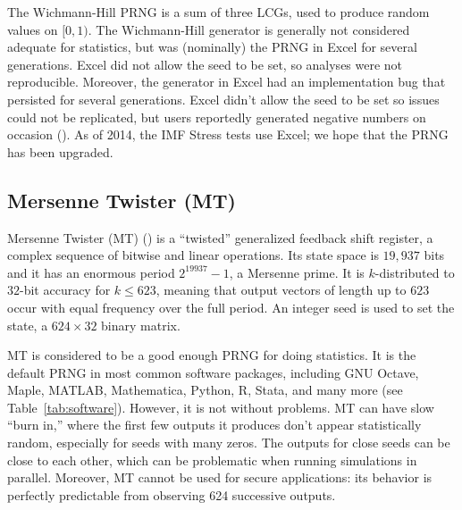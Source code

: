 \documentclass[graybox]{svmult}
\newcommand{\todo}[1]{{\color{red}{TO DO: \sc #1}}}
\begin{document}
The Wichmann-Hill PRNG is a sum of three LCGs, used to produce random values on $[0, 1)$.
%
The Wichmann-Hill generator is generally not considered adequate for statistics, but was (nominally) the PRNG in Excel for several generations. 
Excel did not allow the seed to be set, so analyses were not reproducible.
Moreover, the generator in Excel had an implementation bug that persisted for several generations.
Excel didn't allow the seed to be set so issues could not be replicated, but users reportedly generated negative numbers on occasion (\cite{mccullough_microsoft_2008}).
As of 2014, the IMF Stress tests use Excel; we hope that the PRNG has been upgraded.
\todo{@Philip: is there a citation for this?}

\subsection{Mersenne Twister (MT)}

Mersenne Twister (MT) (\cite{matsumoto_mersenne_1998}) is a ``twisted'' generalized feedback shift register, a complex sequence of bitwise and linear operations.
Its state space is $19,937$ bits and it has an enormous period $2^{19937}-1$, a Mersenne prime.
It is $k$-distributed to $32$-bit accuracy for $k \leq 623$, meaning that output vectors of length up to $623$ occur with equal frequency over the full period.
An integer seed is used to set the state, a $624 \times 32$ binary matrix.

MT is considered to be a good enough PRNG for doing statistics.
It is the default PRNG in most common software packages, including GNU Octave, Maple, MATLAB, Mathematica, Python, R, Stata, and many more (see Table~\ref{tab:software}).
However, it is not without problems.
MT can have slow ``burn in,'' where the first few outputs it produces don't appear statistically random, especially for seeds with many zeros. \todo{CITE}
The outputs for close seeds can be close to each other, which can be problematic when running simulations in parallel. 
Moreover, MT cannot be used for secure applications: its behavior is perfectly predictable from observing 624 successive outputs.
\end{document}

